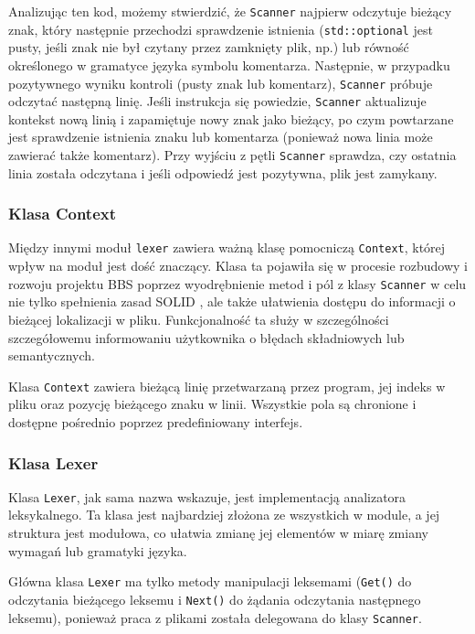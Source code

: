 Analizując ten kod, możemy stwierdzić, że \texttt{Scanner} najpierw odczytuje bieżący znak, który następnie przechodzi sprawdzenie istnienia (\texttt{std::optional} jest pusty, jeśli znak nie był czytany przez zamknięty plik, np.) lub równość określonego w gramatyce języka symbolu komentarza. Następnie, w przypadku pozytywnego wyniku kontroli (pusty znak lub komentarz), \texttt{Scanner} próbuje odczytać następną linię. Jeśli instrukcja się powiedzie, \texttt{Scanner} aktualizuje kontekst nową linią i zapamiętuje nowy znak jako bieżący, po czym powtarzane jest sprawdzenie istnienia znaku lub komentarza (ponieważ nowa linia może zawierać także komentarz). Przy wyjściu z pętli \texttt{Scanner} sprawdza, czy ostatnia linia została odczytana i jeśli odpowiedź jest pozytywna, plik jest zamykany.

\subsubsection{Klasa Context}
Między innymi moduł \texttt{lexer} zawiera ważną klasę pomocniczą \texttt{Context}, której wpływ na moduł jest dość znaczący. Klasa ta pojawiła się w procesie rozbudowy i rozwoju projektu BBS poprzez wyodrębnienie metod i pól z klasy \texttt{Scanner} w celu nie tylko spełnienia zasad SOLID \cite{solid}, ale także ułatwienia dostępu do informacji o bieżącej lokalizacji w pliku. Funkcjonalność ta służy w szczególności szczegółowemu informowaniu użytkownika o błędach składniowych lub semantycznych.

Klasa \texttt{Context} zawiera bieżącą linię przetwarzaną przez program, jej indeks w pliku oraz pozycję bieżącego znaku w linii. Wszystkie pola są chronione i dostępne pośrednio poprzez predefiniowany interfejs.

\subsubsection{Klasa Lexer}
Klasa \texttt{Lexer}, jak sama nazwa wskazuje, jest implementacją analizatora leksykalnego. Ta klasa jest najbardziej złożona ze wszystkich w module, a jej struktura jest modułowa, co ułatwia zmianę jej elementów w miarę zmiany wymagań lub gramatyki języka.

Główna klasa \texttt{Lexer} ma tylko metody manipulacji leksemami (\texttt{Get()} do odczytania bieżącego leksemu i \texttt{Next()} do żądania odczytania następnego leksemu), ponieważ praca z plikami została delegowana do klasy \texttt{Scanner}.

